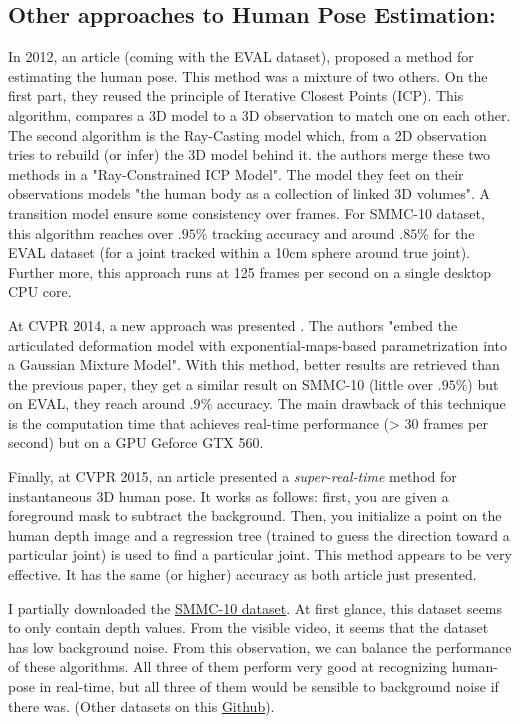 \documentclass[a4paper]{article}
\begin{document}
		\subsection{Other approaches to Human Pose Estimation: }
			In 2012, an article\cite{ganapathi2012real} (coming with the EVAL dataset), proposed a method for estimating the human pose. This method was a mixture of two others. On the first part, they reused the principle of Iterative Closest Points (ICP). This algorithm, compares a 3D model to a 3D observation to match one on each other. The second algorithm is the Ray-Casting model which, from a 2D observation tries to rebuild (or infer) the 3D model behind it. the authors merge these two methods in a "Ray-Constrained ICP Model". The model they feet on their observations models "the human body as a collection of linked 3D volumes". A transition model ensure some consistency over frames. For SMMC-10 dataset, this algorithm reaches over $.95\%$ tracking accuracy and around $.85\%$ for the EVAL dataset (for a joint tracked within a 10cm sphere around true joint). Further more, this approach runs at 125 frames per second on a single desktop CPU core.

			At CVPR 2014, a new approach was presented \cite{ye2014real}. The authors "embed the articulated deformation model with exponential-maps-based parametrization into a Gaussian Mixture Model". With this method, better results are retrieved than the previous paper, they get a similar result on SMMC-10 (little over $.95\%$) but on EVAL, they reach around $.9\%$ accuracy. The main drawback of this technique is the computation time that achieves real-time performance (> 30 frames per second) but on a GPU Geforce GTX 560.

			Finally, at CVPR 2015\cite{yub2015random}, an article presented a \textit{super-real-time} method for instantaneous 3D human pose. It works as follows: first, you are given a foreground mask to subtract the background. Then, you initialize a point on the human depth image and a regression tree (trained to guess the direction toward a particular joint) is used to find a particular joint. This method appears to be very effective. It has the same (or higher) accuracy as both article just presented. 

			\begin{mdframed}[backgroundcolor = gray!30]
				I partially downloaded the \href{http://ai.stanford.edu/~varung/cvpr10/}{SMMC-10 dataset}. At first glance, this dataset seems to only contain depth values. From the visible video, it seems that the dataset has low background noise. From this observation, we can balance the performance of these algorithms. All three of them perform very good at recognizing human-pose in real-time, but all three of them would be sensible to background noise if there was. (Other datasets on this \href{https://github.com/colincsl/RGBD-Dataset-Reader}{Github}).
			\end{mdframed}
		
\end{document}
